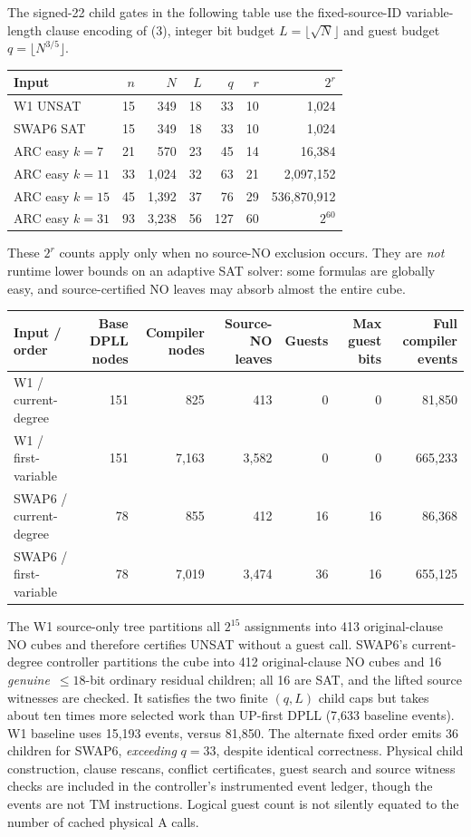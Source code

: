 \documentclass[10pt]{article}
\begin{document}
The signed-22 child gates in the following table use the fixed-source-ID variable-length clause encoding of (3), integer bit budget $L=\lfloor\sqrt N\rfloor$ and guest budget $q=\lfloor N^{3/5}\rfloor$.
\begin{center}\small
\begin{tabular}{lrrrrrr}
\toprule Input&$n$&$N$&$L$&$q$&$r$&$2^r$\\\midrule
W1 UNSAT&15&349&18&33&10&1,024\\
SWAP6 SAT&15&349&18&33&10&1,024\\
ARC easy $k=7$&21&570&23&45&14&16,384\\
ARC easy $k=11$&33&1,024&32&63&21&2,097,152\\
ARC easy $k=15$&45&1,392&37&76&29&536,870,912\\
ARC easy $k=31$&93&3,238&56&127&60&$2^{60}$\\\bottomrule
\end{tabular}
\end{center}
These $2^r$ counts apply only when no source-NO exclusion occurs. They are \emph{not} runtime lower bounds on an adaptive SAT solver: some formulas are globally easy, and source-certified NO leaves may absorb almost the entire cube.

\begin{center}\scriptsize\setlength{\tabcolsep}{3pt}
\begin{tabular}{lrrrrrr}
\toprule Input / order&Base DPLL nodes&Compiler nodes&Source-NO leaves&Guests&Max guest bits&Full compiler events\\\midrule
W1 / current-degree&151&825&413&0&0&81,850\\
W1 / first-variable&151&7,163&3,582&0&0&665,233\\
SWAP6 / current-degree&78&855&412&16&16&86,368\\
SWAP6 / first-variable&78&7,019&3,474&36&16&655,125\\\bottomrule
\end{tabular}
\end{center}
The W1 source-only tree partitions all $2^{15}$ assignments into 413 original-clause NO cubes and therefore certifies UNSAT without a guest call. SWAP6's current-degree controller partitions the cube into 412 original-clause NO cubes and 16 \emph{genuine}\ $\le18$-bit ordinary residual children; all 16 are SAT, and the lifted source witnesses are checked. It satisfies the two finite $(q,L)$ child caps but takes about ten times more selected work than UP-first DPLL (7,633 baseline events). W1 baseline uses 15,193 events, versus 81,850. The alternate fixed order emits 36 children for SWAP6, \emph{exceeding} $q=33$, despite identical correctness. Physical child construction, clause rescans, conflict certificates, guest search and source witness checks are included in the controller's instrumented event ledger, though the events are not TM instructions. Logical guest count is not silently equated to the number of cached physical A calls.
\end{document}
